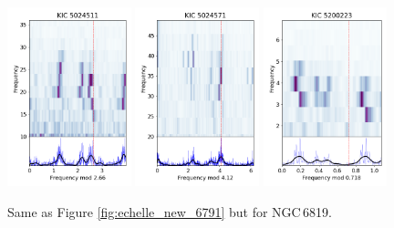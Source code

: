 \begin{figure}
    \centering
        \includegraphics[width=0.32\textwidth]{Chapter5/5024511_echelle.png}
        \includegraphics[width=0.32\textwidth]{Chapter5/5024571_echelle.png}
        \includegraphics[width=0.32\textwidth]{Chapter5/5200223_echelle.png}
    \caption[\'Echelle diagrams for the newly identified cluster red giants in NGC\,6819 (I)]{Same as Figure \ref{fig:echelle_new_6791} but for NGC\,6819.}
    \label{fig:echelle_new_6819}
\end{figure}

